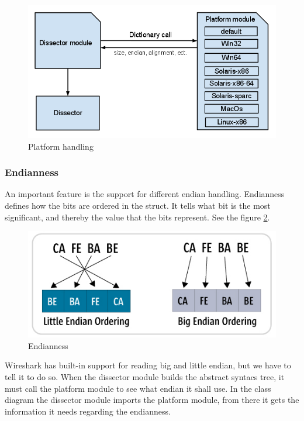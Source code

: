 \begin{figure}[!htb]
	\includegraphics[width=\textwidth]{./sprints/img/platformhandling}
	\caption{Platform handling\label{fig:platformhandling}}
\end{figure}

\subsubsection{Endianness}
An important feature is the support for different endian handling. Endianness defines how the bits are ordered in the struct. It tells what bit is the most significant, and thereby the value that the bits represent. See the figure \ref{fig:endianness}.
\begin{figure}[!htb]
	\includegraphics[width=\textwidth]{./sprints/img/endianness}
	\caption{Endianness\label{fig:endianness}}
\end{figure}
Wireshark has built-in support for reading big and little endian, but we have to tell it to do so. When the dissector module builds the abstract syntacs tree, it must call the platform module to see what endian it shall use. In the class diagram the dissector module imports the platform module, from there it gets the information it needs regarding the endianness. 

